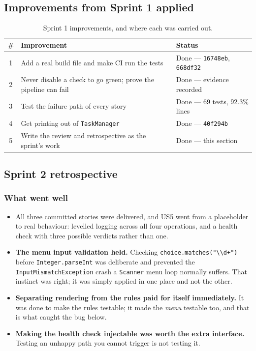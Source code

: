 \documentclass[11pt,a4paper]{article}
\newcommand{\code}[1]{\texttt{\small #1}}
\begin{document}
\subsection{Improvements from Sprint 1 applied}

\begin{table}[h]
\centering
\small
\begin{tabularx}{\textwidth}{@{}c X L{4.6cm}@{}}
\toprule
\textbf{\#} & \textbf{Improvement} & \textbf{Status} \\
 & Add a real build file and make CI run the tests & Done --- \code{16748eb}, \code{668df32} \\
2 & Never disable a check to go green; prove the pipeline can fail & Done --- evidence recorded \\
3 & Test the failure path of every story & Done --- 69 tests, 92.3\% lines \\
4 & Get printing out of \code{TaskManager} & Done --- \code{40f294b} \\
5 & Write the review and retrospective as the sprint's work & Done --- this section \\
\bottomrule
\end{tabularx}
\caption{Sprint 1 improvements, and where each was carried out.}
\end{table}

\subsection{Sprint 2 retrospective}

\subsubsection*{What went well}
\begin{itemize}
  \item All three committed stories were delivered, and US5 went from a
        placeholder to real behaviour: levelled logging across all four
        operations, and a health check with three possible verdicts rather than
        one.
  \item \textbf{The menu input validation held.} Checking
        \code{choice.matches("\textbackslash\textbackslash d+")} before
        \code{Integer.parseInt} was deliberate and prevented the
        \code{InputMismatchException} crash a \code{Scanner} menu loop normally
        suffers. That instinct was right; it was simply applied in one place and
        not the other.
  \item \textbf{Separating rendering from the rules paid for itself
        immediately.} It was done to make the rules testable; it made the
        \emph{menu} testable too, and that is what caught the bug below.
  \item \textbf{Making the health check injectable was worth the extra
        interface.} Testing an unhappy path you cannot trigger is not testing
        it.
\end{itemize}
\end{document}
